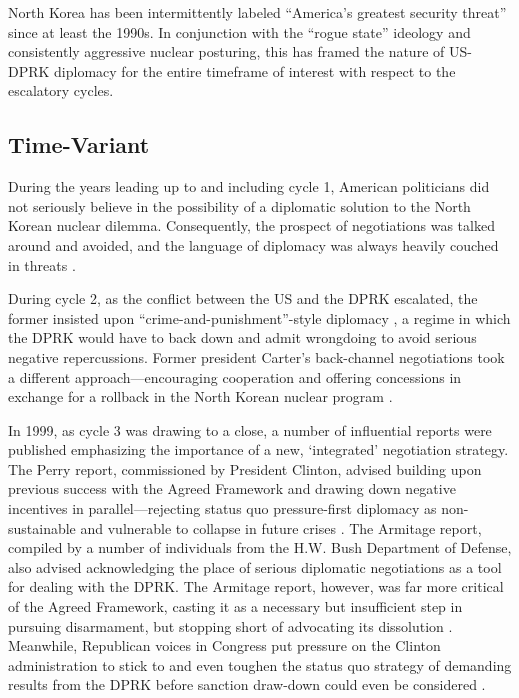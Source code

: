 North Korea has been intermittently labeled ``America's greatest security threat'' \cite{cumings} since at least the 1990s. In conjunction with the ``rogue state'' ideology and consistently aggressive nuclear posturing, this has framed the nature of US-DPRK diplomacy for the entire timeframe of interest with respect to the escalatory cycles.

\subsection{Time-Variant}

During the years leading up to and including cycle 1, American politicians did not seriously believe in the possibility of a diplomatic solution to the North Korean nuclear dilemma. Consequently, the prospect of negotiations was talked around and avoided, and the language of diplomacy was always heavily couched in threats \cite{sigal}.

During cycle 2, as the conflict between the US and the DPRK escalated, the former insisted upon ``crime-and-punishment''-style diplomacy \cite{bleiker}, a regime in which the DPRK would have to back down and admit wrongdoing to avoid serious negative repercussions. Former president Carter's back-channel negotiations took a different approach---encouraging cooperation and offering concessions in exchange for a rollback in the North Korean nuclear program \cite{sigal}.

In 1999, as cycle 3 was drawing to a close, a number of influential reports were published emphasizing the importance of a new, `integrated' negotiation strategy. The Perry report, commissioned by President Clinton, advised building upon previous success with the Agreed Framework and drawing down negative incentives in parallel---rejecting status quo pressure-first diplomacy as non-sustainable and vulnerable to collapse in future crises \cite{perry}. The Armitage report, compiled by a number of individuals from the H.W. Bush Department of Defense, also advised acknowledging the place of serious diplomatic negotiations as a tool for dealing with the DPRK. The Armitage report, however, was far more critical of the Agreed Framework, casting it as a necessary but insufficient step in pursuing disarmament, but stopping short of advocating its dissolution \cite{armitage}. Meanwhile, Republican voices in Congress put pressure on the Clinton administration to stick to and even toughen the status quo strategy of demanding results from the DPRK before sanction draw-down could even be considered \cite{harnisch}. 

